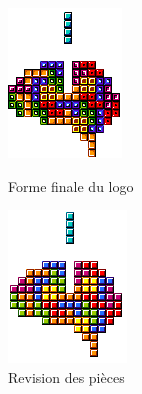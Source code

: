 \documentclass{report}
\begin{document}
\begin{figure}[h!]
	\begin{minipage}{.5\textwidth}
		\centering
		\includegraphics[width=0.75\linewidth]{Team_logo_004.png}
		\caption{Forme finale du logo}
		\label{fig:sub2}
	\end{minipage}
	\begin{minipage}{.5\textwidth}
		\centering
		\includegraphics[width=0.75\linewidth]{Team_logo_005.png}
		\caption{Revision des pi\`{e}ces}
		\label{fig:sub2}
	\end{minipage}
\end{figure}
\end{document}
